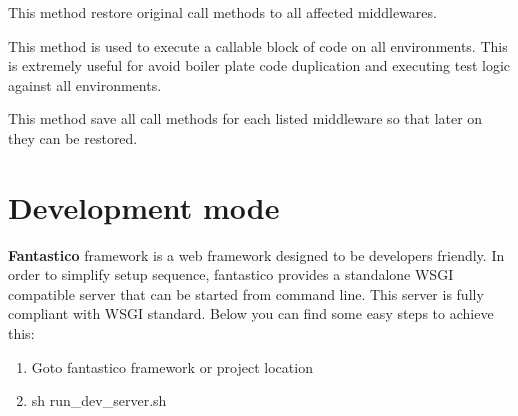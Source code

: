 \documentclass[letterpaper,10pt,english]{sphinxmanual}
\begin{document}
\begin{fulllineitems}

\begin{fulllineitems}
\label{get_started/contribute:fantastico.tests.base_case.FantasticoIntegrationTestCase._restore_call_methods}
This method restore original call methods to all affected middlewares.

\end{fulllineitems}


\begin{fulllineitems}
\label{get_started/contribute:fantastico.tests.base_case.FantasticoIntegrationTestCase._run_test_all_envs}
This method is used to execute a callable block of code on all environments. This is extremely useful for
avoid boiler plate code duplication and executing test logic against all environments.

\end{fulllineitems}


\begin{fulllineitems}
\label{get_started/contribute:fantastico.tests.base_case.FantasticoIntegrationTestCase._save_call_methods}
This method save all call methods for each listed middleware so that later on they can be restored.

\end{fulllineitems}


\end{fulllineitems}



\section{Development mode}
\label{get_started/dev_mode::doc}\label{get_started/dev_mode:development-mode}
\textbf{Fantastico} framework is a web framework designed to be developers friendly. In order to simplify setup sequence, fantastico
provides a standalone WSGI compatible server that can be started from command line. This server is fully compliant with WSGI
standard. Below you can find some easy steps to achieve this:
\begin{enumerate}
\item {} 
Goto fantastico framework or project location

\item {} 
sh run\_dev\_server.sh

\end{enumerate}
\end{document}
